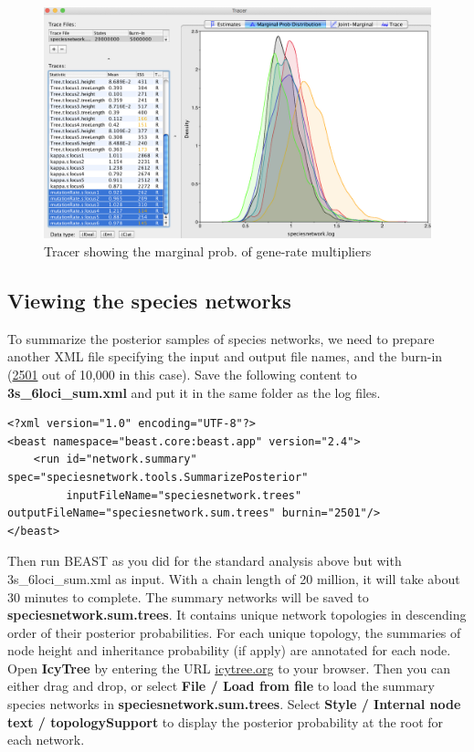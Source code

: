 \documentclass[11pt]{article}
\begin{document}
\begin{figure}[h]
\center
\includegraphics[width=1.0\textwidth]{figs/fig11_tracer2.png}
\caption{Tracer showing the marginal prob. of gene-rate multipliers}
\label{fig_tracer2}
\end{figure}

\clearpage

\subsection*{Viewing the species networks}

To summarize the posterior samples of species networks, we need to prepare another XML file specifying the input and output file names, and the burn-in (\underline{2501} out of 10,000 in this case). Save the following content to \textbf{3s\_6loci\_sum.xml} and put it in the same folder as the log files.

{\tiny
\begin{verbatim}
<?xml version="1.0" encoding="UTF-8"?>
<beast namespace="beast.core:beast.app" version="2.4">
    <run id="network.summary" spec="speciesnetwork.tools.SummarizePosterior"
         inputFileName="speciesnetwork.trees" outputFileName="speciesnetwork.sum.trees" burnin="2501"/>
</beast>
\end{verbatim}}

\noindent Then run BEAST as you did for the standard analysis above but with 3s\_6loci\_sum.xml as input. With a chain length of 20 million, it will take about 30 minutes to complete. The summary networks will be saved to \textbf{speciesnetwork.sum.trees}. It contains unique network topologies in descending order of their posterior probabilities. For each unique topology, the summaries of node height and inheritance probability (if apply) are annotated for each node. 
Open \textbf{IcyTree} by entering the URL \url{icytree.org} to your browser. Then you can either drag and drop, or select \textbf{File / Load from file} to load the summary species networks in \textbf{speciesnetwork.sum.trees}. Select \textbf{Style / Internal node text / topologySupport} to display the posterior probability at the root for each network.
\end{document}

